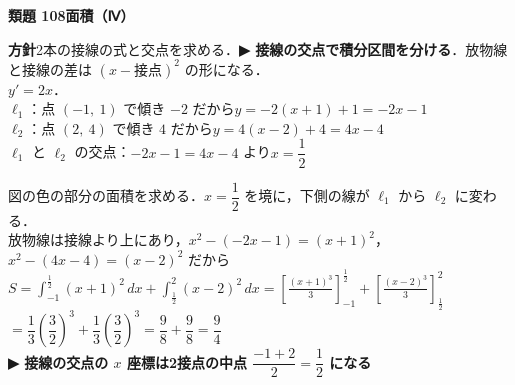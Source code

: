 \documentclass[a4paper,11pt]{ltjsarticle}
\newcommand{\ans}[2]{\Needspace{5\baselineskip}\vspace{6pt}%
  {\sffamily\bfseries 類題 #1\quad #2}\par}
\newcommand{\point}[1]{\textsf{\bfseries ▶ #1}}
\newcommand{\ax}[4]{\draw[->] (#1,0)--(#2,0) node[right]{\scriptsize $x$};
  \draw[->] (0,#3)--(0,#4) node[above]{\scriptsize $y$};
  \node[below left] at (0,0){\scriptsize O};}
\begin{document}
\ans{108}{面積（Ⅳ）}
\begin{kai}
\textbf{方針}\quad 2本の接線の式と交点を求める．\point{接線の交点で積分区間を分ける}．放物線と接線の差は $(x-\text{接点})^2$ の形になる．\\[2pt]
$y'=2x$．\\
$\ell_1$：点 $(-1,\ 1)$ で傾き $-2$ だから\quad $y=-2(x+1)+1=-2x-1$\\
$\ell_2$：点 $(2,\ 4)$ で傾き $4$ だから\quad $y=4(x-2)+4=4x-4$\\
$\ell_1$ と $\ell_2$ の交点：$-2x-1=4x-4$ より\quad $x=\dfrac12$\\[2pt]
\begin{center}
\end{center}
図の色の部分の面積を求める．$x=\dfrac12$ を境に，下側の線が $\ell_1$ から $\ell_2$ に変わる．\\[2pt]
放物線は接線より上にあり，$x^2-(-2x-1)=(x+1)^2$，$x^2-(4x-4)=(x-2)^2$ だから\\[2pt]
$S=\displaystyle\int_{-1}^{\frac12}(x+1)^2\,dx+\int_{\frac12}^2(x-2)^2\,dx=\left[\frac{(x+1)^3}3\right]_{-1}^{\frac12}+\left[\frac{(x-2)^3}3\right]_{\frac12}^2$\\[2pt]
\hspace*{1.5em}$=\dfrac13\left(\dfrac32\right)^3+\dfrac13\left(\dfrac32\right)^3=\dfrac{9}{8}+\dfrac98=\dfrac94$\\
\point{接線の交点の $x$ 座標は2接点の中点 $\dfrac{-1+2}2=\dfrac12$ になる}
\end{kai}
\end{document}
